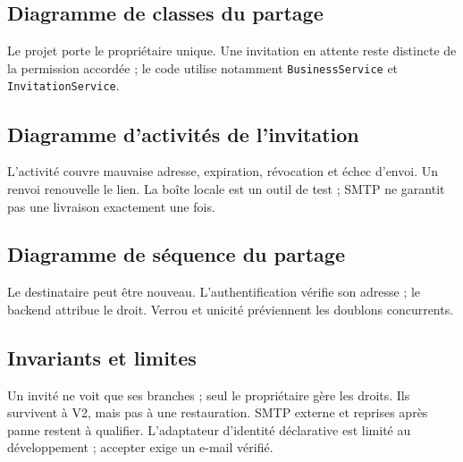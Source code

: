 \subsection{Diagramme de classes du partage}
Le projet porte le propriétaire unique. Une invitation en attente reste distincte de la permission accordée ; le code utilise notamment \texttt{BusinessService} et \texttt{InvitationService}.

\subsection{Diagramme d'activités de l'invitation}
L'activité couvre mauvaise adresse, expiration, révocation et échec d'envoi. Un renvoi renouvelle le lien. La boîte locale est un outil de test ; SMTP ne garantit pas une livraison exactement une fois.

\subsection{Diagramme de séquence du partage}
Le destinataire peut être nouveau. L'authentification vérifie son adresse ; le backend attribue le droit. Verrou et unicité préviennent les doublons concurrents.

\subsection{Invariants et limites}
Un invité ne voit que ses branches ; seul le propriétaire gère les droits. Ils survivent à V2, mais pas à une restauration. SMTP externe et reprises après panne restent à qualifier. L'adaptateur d'identité déclarative est limité au développement ; accepter exige un e-mail vérifié.

